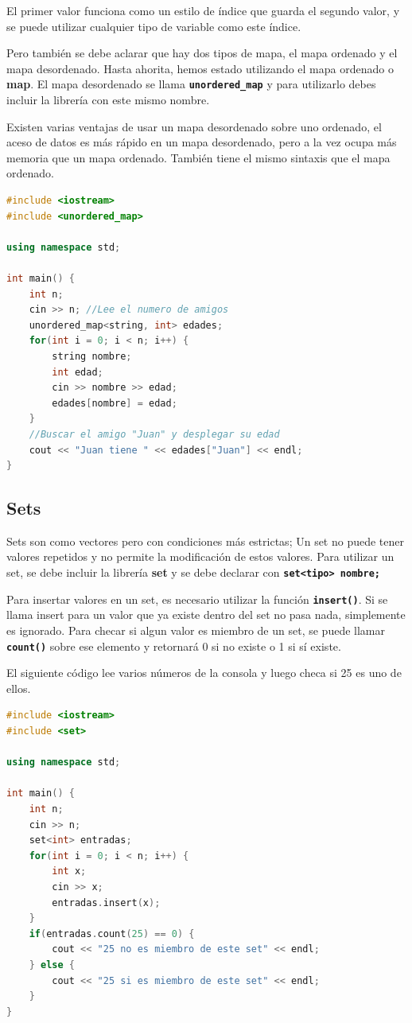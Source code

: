 \documentclass{article}
\begin{document}
El primer valor funciona como un estilo de índice que guarda el segundo valor, y se puede utilizar cualquier tipo de variable como este índice.

Pero también se debe aclarar que hay dos tipos de mapa, el mapa ordenado y el mapa desordenado. Hasta ahorita, hemos estado utilizando el mapa ordenado o \textbf{map}. El mapa desordenado se llama \textbf{\lstinline{unordered_map}} y para utilizarlo debes incluir la librería con este mismo nombre.

Existen varias ventajas de usar un mapa desordenado sobre uno ordenado, el aceso de datos es más rápido en un mapa desordenado, pero a la vez ocupa más memoria que un mapa ordenado. También tiene el mismo sintaxis que el mapa ordenado.

\begin{lstlisting}[language=C++, title=Mapa desordenado]
#include <iostream>
#include <unordered_map>

using namespace std;

int main() {
	int n;
	cin >> n; //Lee el numero de amigos
	unordered_map<string, int> edades;
	for(int i = 0; i < n; i++) {
		string nombre;
		int edad;
		cin >> nombre >> edad;
		edades[nombre] = edad;
	}
	//Buscar el amigo "Juan" y desplegar su edad
	cout << "Juan tiene " << edades["Juan"] << endl;
}
\end{lstlisting}

\subsection{Sets}

Sets son como vectores pero con condiciones más estrictas; Un set no puede tener valores repetidos y no permite la modificación de estos valores. Para utilizar un set, se debe incluir la librería \textbf{set} y se debe declarar con \textbf{\lstinline{set<tipo> nombre;}}

Para insertar valores en un set, es necesario utilizar la función \textbf{\lstinline{insert()}}. Si se llama insert para un valor que ya existe dentro del set no pasa nada, simplemente es ignorado. Para checar si algun valor es miembro de un set, se puede llamar \textbf{\lstinline{count()}} sobre ese elemento y retornará 0 si no existe o 1 si sí existe.

El siguiente código lee varios números de la consola y luego checa si 25 es uno de ellos.

\begin{lstlisting}[language=C++, title=Sets]
#include <iostream>
#include <set>

using namespace std;

int main() {
	int n;
	cin >> n;
	set<int> entradas;
	for(int i = 0; i < n; i++) {
		int x;
		cin >> x;
		entradas.insert(x);
	}
	if(entradas.count(25) == 0) {
		cout << "25 no es miembro de este set" << endl;
	} else {
		cout << "25 si es miembro de este set" << endl;
	}
}
\end{lstlisting}
\end{document}
